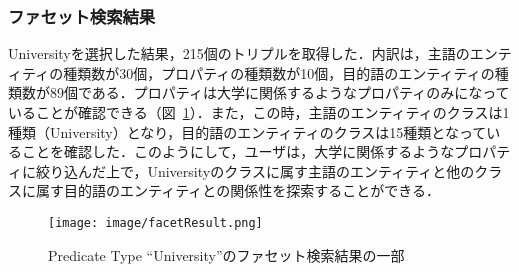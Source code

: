 \subsubsection{ファセット検索結果}
Universityを選択した結果，215個のトリプルを取得した．内訳は，主語のエンティティの種類数が30個，プロパティの種類数が10個，目的語のエンティティの種類数が89個である．プロパティは大学に関係するようなプロパティのみになっていることが確認できる（図~\ref{fig:facetResult}）．また，この時，主語のエンティティのクラスは1種類（University）となり，目的語のエンティティのクラスは15種類となっていることを確認した．このようにして，ユーザは，大学に関係するようなプロパティに絞り込んだ上で，Universityのクラスに属す主語のエンティティと他のクラスに属す目的語のエンティティとの関係性を探索することができる．
%
\begin{figure}[h]
\centering
\texttt{[image: image/facetResult.png]}
\caption{\small
Predicate Type ``University''のファセット検索結果の一部
}
\label{fig:facetResult}
\end{figure}
%



